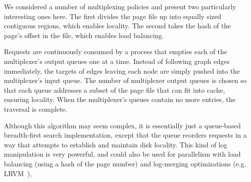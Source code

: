 \documentclass[letterpaper,twocolumn,english]{article}
\newcommand{\rcs}[1]{\textcolor{green}{\bf RCS: #1}}
\begin{document}
We considered a number of multiplexing policies and present two
particularly interesting ones here.  The first divides the page file
up into equally sized contiguous regions, which enables locality.  The second takes the hash
of the page's offset in the file, which enables load balancing.

Requests are continuously consumed by a process that empties each of
the multiplexer's output queues one at a time.  Instead of following
graph edges immediately, the targets of edges leaving each node are
simply pushed into the multiplexer's input queue.  The number of
multiplexer output queues is chosen so that each queue addresses a
subset of the page file that can fit into cache, ensuring locality.  When the
multiplexer's queues contain no more entries, the traversal is
complete.  

Although this algorithm may seem complex, it is essentially just a
queue-based breadth-first search implementation, except that the queue
reorders requests in a way that attempts to establish and maintain
disk locality.  This kind of log manipulation is very powerful, and
could also be used for parallelism with load balancing (using a hash
of the page number) and log-merging optimizations
(e.g. LRVM~\cite{LRVM}),



\end{document}
